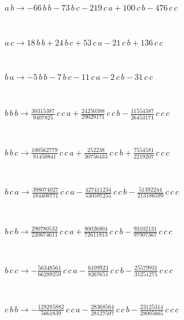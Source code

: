 \documentclass[rep10,leqno]{report}
\begin{document}
\begin{minipage}{6in}
$
a\,
 b\rightarrow -66\,
 b\,
 b - 73\,
 b\,
 c - 219\,
 c\,
 a + 100\,
 c\,
 b - 476\,
 c\,
 c
$
\end{minipage}\medskip \\
\begin{minipage}{6in}
$
a\,
 c\rightarrow 18\,
 b\,
 b + 24\,
 b\,
 c + 53\,
 c\,
 a - 21\,
 c\,
 b + 136\,
 c\,
 c
$
\end{minipage}\medskip \\
\begin{minipage}{6in}
$
b\,
 a\rightarrow -5\,
 b\,
 b - 7\,
 b\,
 c - 11\,
 c\,
 a - 2\,
 c\,
 b - 31\,
 c\,
 c
$
\end{minipage}\medskip \\
\begin{minipage}{6in}
$
b\,
 b\,
 b\rightarrow \frac{30315387}{9407825}\,
 c\,
 c\,
 a + \frac{24250388}{29029171}\,
 c\,
 c\,
 b - \frac{11554587}{26453171}\,
 c\,
 c\,
 c
$
\end{minipage}\medskip \\
\begin{minipage}{6in}
$
b\,
 b\,
 c\rightarrow \frac{100562779}{81450841}\,
 c\,
 c\,
 a + \frac{252238}{30756433}\,
 c\,
 c\,
 b + \frac{7554581}{2219207}\,
 c\,
 c\,
 c
$
\end{minipage}\medskip \\
\begin{minipage}{6in}
$
b\,
 c\,
 a\rightarrow \frac{398074027}{184408771}\,
 c\,
 c\,
 a - \frac{427411234}{530597255}\,
 c\,
 c\,
 b - \frac{51392244}{213186599}\,
 c\,
 c\,
 c
$
\end{minipage}\medskip \\
\begin{minipage}{6in}
$
b\,
 c\,
 b\rightarrow \frac{290780532}{220674611}\,
 c\,
 c\,
 a + \frac{80026804}{72611813}\,
 c\,
 c\,
 b - \frac{93102131}{97907367}\,
 c\,
 c\,
 c
$
\end{minipage}\medskip \\
\begin{minipage}{6in}
$
b\,
 c\,
 c\rightarrow -\frac{56348561}{66289259}\,
 c\,
 c\,
 a - \frac{6109923}{8267651}\,
 c\,
 c\,
 b - \frac{25579931}{31251275}\,
 c\,
 c\,
 c
$
\end{minipage}\medskip \\
\begin{minipage}{6in}
$
c\,
 b\,
 b\rightarrow -\frac{128285882}{5661839}\,
 c\,
 c\,
 a - \frac{28368564}{28127507}\,
 c\,
 c\,
 b - \frac{23125314}{28005665}\,
 c\,
 c\,
 c
$
\end{minipage}\medskip \\
\end{document}
